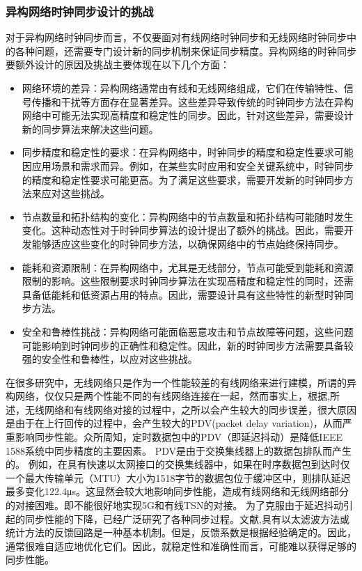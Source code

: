 \documentclass[UTF8,a4paper,12pt]{ctexart}
\numberwithin{equation}{section}
\begin{document}
\subsubsection{异构网络时钟同步设计的挑战}
对于异构网络时钟同步而言，不仅要面对有线网络时钟同步和无线网络时钟同步中的各种问题，还需要专门设计新的同步机制来保证同步精度。异构网络的时钟同步要额外设计的原因及挑战主要体现在以下几个方面：
\begin{itemize}
	\item 网络环境的差异：异构网络通常由有线和无线网络组成，它们在传输特性、信号传播和干扰等方面存在显著差异。这些差异导致传统的时钟同步方法在异构网络中可能无法实现高精度和稳定性的同步。因此，针对这些差异，需要设计新的同步算法来解决这些问题。
	\item 同步精度和稳定性的要求：在异构网络中，时钟同步的精度和稳定性要求可能因应用场景和需求而异。例如，在某些实时应用和安全关键系统中，时钟同步的精度和稳定性要求可能更高。为了满足这些要求，需要开发新的时钟同步方法来应对这些挑战。
	\item 节点数量和拓扑结构的变化：异构网络中的节点数量和拓扑结构可能随时发生变化。这种动态性对于时钟同步算法的设计提出了额外的挑战。因此，需要开发能够适应这些变化的时钟同步方法，以确保网络中的节点始终保持同步。
	\item 能耗和资源限制：在异构网络中，尤其是无线部分，节点可能受到能耗和资源限制的影响。这些限制要求时钟同步算法在实现高精度和稳定性的同时，还需具备低能耗和低资源占用的特点。因此，需要设计具有这些特性的新型时钟同步方法。
	\item 安全和鲁棒性挑战：异构网络可能面临恶意攻击和节点故障等问题，这些问题可能影响到时钟同步的正确性和稳定性。因此，新的时钟同步方法需要具备较强的安全性和鲁棒性，以应对这些挑战。
\end{itemize}

在很多研究中，无线网络只是作为一个性能较差的有线网络来进行建模，所谓的异构网络，仅仅只是两个性能不同的有线网络连接在一起，然而事实上，根据\cite{chaloupka2014clock},\cite{johannessen2004time}所述，无线网络和有线网络对接的过程中，之所以会产生较大的同步误差，很大原因是由于在上行回传的过程中，会产生较大的PDV(packet delay variation)，从而严重影响同步性能。众所周知，定时数据包中的PDV（即延迟抖动）是降低IEEE 1588系统中同步精度的主要因素。 PDV是由于交换集线器上的数据包排队而产生的。 例如，在具有快速以太网接口的交换集线器中，如果在时序数据包到达时仅一个最大传输单元（MTU）大小为1518字节的数据包位于缓冲区中，则排队延迟最多变化122.4μs。这显然会较大地影响同步性能，造成有线网络和无线网络部分的对接困难。即不能很好地实现5G和有线TSN的对接。
为了克服由于延迟抖动引起的同步性能的下降，已经广泛研究了各种同步过程。文献\cite{murakami2009improvement},\cite{subrahmanyan2007implementation}具有以太滤波方法或统计方法的反馈回路是一种基本机制。但是，反馈系数是根据经验确定的。因此，通常很难自适应地优化它们。因此，就稳定性和准确性而言，可能难以获得足够的同步性能。
\end{document}

